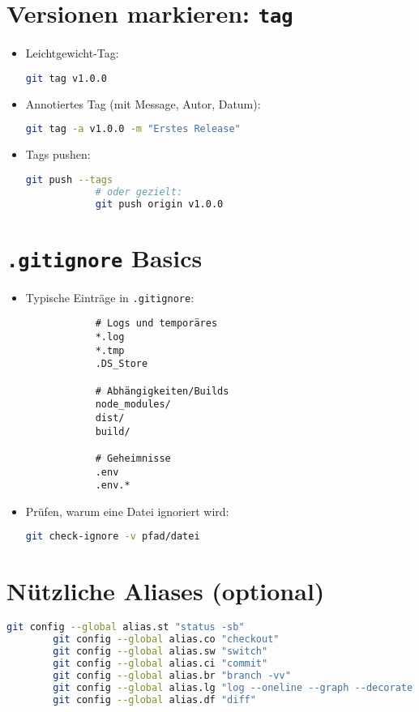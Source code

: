 \documentclass[a4paper,11pt]{article}
\begin{document}
	\section{Versionen markieren: \texttt{tag}}
	\begin{itemize}
		\item Leichtgewicht-Tag:
		\begin{lstlisting}[language=bash]
			git tag v1.0.0
		\end{lstlisting}
		\item Annotiertes Tag (mit Message, Autor, Datum):
		\begin{lstlisting}[language=bash]
			git tag -a v1.0.0 -m "Erstes Release"
		\end{lstlisting}
		\item Tags pushen:
		\begin{lstlisting}[language=bash]
			git push --tags
			# oder gezielt:
			git push origin v1.0.0
		\end{lstlisting}
	\end{itemize}
	
	\section{\texttt{.gitignore} Basics}
	\begin{itemize}
		\item Typische Einträge in \texttt{.gitignore}:
		\begin{lstlisting}
			# Logs und temporäres
			*.log
			*.tmp
			.DS_Store
			
			# Abhängigkeiten/Builds
			node_modules/
			dist/
			build/
			
			# Geheimnisse
			.env
			.env.*
		\end{lstlisting}
		\item Prüfen, warum eine Datei ignoriert wird:
		\begin{lstlisting}[language=bash]
			git check-ignore -v pfad/datei
		\end{lstlisting}
	\end{itemize}
	
	\section{Nützliche Aliases (optional)}
	\begin{lstlisting}[language=bash]
		git config --global alias.st "status -sb"
		git config --global alias.co "checkout"
		git config --global alias.sw "switch"
		git config --global alias.ci "commit"
		git config --global alias.br "branch -vv"
		git config --global alias.lg "log --oneline --graph --decorate --all"
		git config --global alias.df "diff"
	\end{lstlisting}
	
\end{document}

